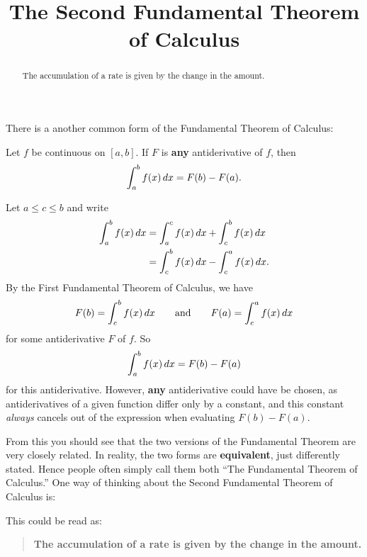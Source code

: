 \documentclass{ximera}
\title[Dig-In:]{The Second Fundamental Theorem of Calculus}
\begin{document}
\begin{abstract}
The accumulation of a rate is given by the change in the amount.
\end{abstract}
\maketitle

There is a another common form of the Fundamental Theorem of Calculus:

\begin{theorem}
  Let $f$ be continuous on $[a,b]$. If $F$ is \textbf{any}
  antiderivative of $f$, then
  \[
  \int_a^b f(x)\,d x = F(b)-F(a).
  \]
  \begin{explanation}
    Let $a\le c\le b$ and write
    \begin{align*}
      \int_a^b f(x) \,d x &= \int_a^c f(x) \,d x + \int_c^b f(x) \,d x \\
      &= \int_c^b f(x) \,d x - \int_c^a f(x) \,d x.
    \end{align*}
    By the First Fundamental Theorem of Calculus, we have
    \[
    F(b) = \int_c^b f(x) \,d x\qquad\text{and}\qquad F(a) = \int_c^a f(x) \,d x
    \] 
    for some antiderivative $F$ of $f$. So
    \[
    \int_a^b f(x) \,d x = F(b)-F(a)
    \]
    for this antiderivative. However, \textbf{any} antiderivative
    could have be chosen, as antiderivatives of a given function
    differ only by a constant, and this constant \textit{always}
    cancels out of the expression when evaluating $F(b)-F(a)$.
\end{explanation}
\end{theorem}

From this you should see that the two versions of the Fundamental
Theorem are very closely related. In reality, the two forms are
\textbf{equivalent}, just differently stated. Hence people often
simply call them both ``The Fundamental Theorem of Calculus.''
One way of thinking about the Second Fundamental Theorem of Calculus is:
\begin{image}
\end{image}
This could be read as:
\begin{quote}\large\textbf{The \textcolor{green!70!black!70!blue}{accumulation} of a \textcolor{blue!70!green}{rate} is given by the \textcolor{purple!50!blue!90!black}{change in the amount}.}
\end{quote}
\end{document}
